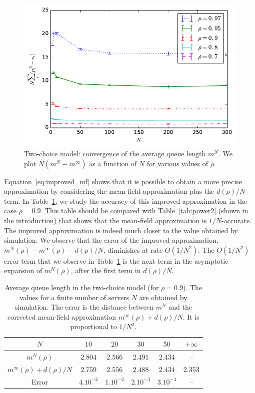 \documentclass[sigconf]{acmart}
\begin{document}
\begin{figure}[t]
  \centering
  \includegraphics[width=0.90\linewidth]{2choice_convergence_mean_noLog}
  \caption{Two-choice model: convergence of the average queue length
    $m^N$. We plot $N(m^N-m^{\infty})$ as a function of $N$ for
    various values of $\rho$.  }
  \label{fig:2-choice_mean}
\end{figure}


Equation~\eqref{eq:improved_mf} shows that it is possible to obtain a
more precise approximation by considering the mean-field approximation
plus the $d(\rho)/N$ term. In Table~\ref{tab:2}, we study the accuracy
of this improved approximation in the case $\rho=0.9$. This table
should be compared with Table~\ref{tab:power2} (shown in the
introduction) that shows that the mean-field approximation is
$1/N$-accurate. The improved approximation is indeed much closer to
the value obtained by simulation: We observe that the error of the
improved approximation, $m^N(\rho)-m^{\infty}(\rho)-d(\rho)/N$,
diminishes at rate $O(1/N^2)$.  The $O(1/N^2)$ error term that we
observe in Table~\ref{tab:2} is the next term in the asymptotic
expansion of $m^N(\rho)$, after the first term in $d(\rho)/N$.


\begin{table}[t]
  \centering
  \begin{tabular}{@{}|@{}c@{}|c|c|c|c|c|}
    \hline
    $N$
    &$  10$  &$  20$  &$  30$  &$  50$ & $+\infty$  \\\hline $m^N(\rho)$
    &$2.804$ &$2.566$ &$2.491$ &$2.434$&-- \\\hline $m^\infty(\rho){+}d(\rho)/N$ 
    &$2.759$ &$2.556$ &$2.488$ &$2.434$&$2.353$ \\\hline Error
    &$4. 10^{-2}$&$1 . 10^{-2}$&$2 .10^{-3}$&$3 . 10^{-4}$&--\\
    \hline
  \end{tabular}
  \caption{Average queue length in the two-choice model (for
    $\rho=0.9$). The values for a finite number of servers  $N$ are obtained by
    simulation. The error is the distance between $m^N$ and the
    corrected mean-field approximation $m^\infty(\rho)+d(\rho)/N$. It is
    proportional to $1/N^2$.}
  \label{tab:2}
\end{table}
\end{document}
